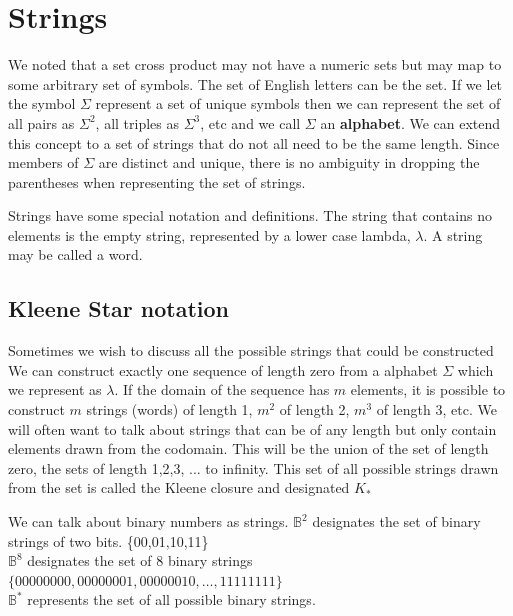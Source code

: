 \documentclass[11pt]{book} %
\theoremstyle {definition}
\theoremstyle {remark}
\begin{document}

\section{Strings}
We noted that a set cross product may not have a numeric sets but may map to some arbitrary set of symbols. The set of English letters can be the set. If we let the symbol $\Sigma$ represent a set of unique symbols then we can represent the set of all pairs as $\Sigma^2$, all triples as $\Sigma^3$, etc and we call $\Sigma$ an \textbf{alphabet}. We can extend this concept to a set of strings that do not all need to be the same length. Since members of $\Sigma$ are distinct and unique, there is no ambiguity in dropping the parentheses when representing the set of strings. 

Strings have some special notation and definitions. The string that contains no elements is the empty string, represented by a lower case lambda, $\lambda$. A string may be called a word.





    \subsection {Kleene Star notation}
Sometimes we wish to discuss all the possible strings that could be constructed  We can construct exactly one sequence of length zero from a alphabet $\Sigma$ which we represent as $\lambda$. If the domain of the sequence has $m$ elements, it is possible to construct $m$ strings (words) of length 1, $m^2$ of length 2, $m^3$ of length 3, etc. We will often want to talk about strings that can be of any length but only contain elements drawn from the codomain. This will be the union of the set of length zero, the sets of length 1,2,3, ... to infinity. This set of all possible strings drawn from the set is called the Kleene closure and designated $K_*$

We can talk about binary numbers as strings. 
$\mathbb{B}^2$ designates the set of binary strings of two bits.  \{00,01,10,11\}\\
$\mathbb{B}^8$ designates the set of 8 binary strings $\{00000000, 00000001, 00000010, \dots ,11111111\}$ \\
$\mathbb{B}^*$ represents the set of all possible binary strings.
\end{document}
